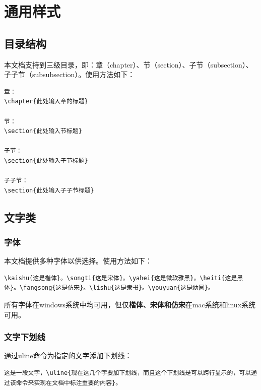 \chapter{通用样式}

\section{目录结构}

本文档支持到三级目录，即：章（chapter）、节（section）、子节（subsection）、子子节（subsubsection）。使用方法如下：

\begin{Verbatim}[]
章：
\chapter{此处输入章的标题}

节：
\section{此处输入节标题}

子节：
\section{此处输入子节标题}

子子节：
\section{此处输入子子节标题}
\end{Verbatim}

\section{文字类}
\subsection{字体}
本文档提供多种字体以供选择。使用方法如下：
\begin{Verbatim}[]
\kaishu{这是楷体}。\songti{这是宋体}。\yahei{这是微软雅黑}。\heiti{这是黑体}。\fangsong{这是仿宋}。\lishu{这是隶书}。\youyuan{这是幼圆}。
\end{Verbatim}

所有字体在windows系统中均可用，但仅\textbf{楷体、宋体和仿宋}在mac系统和linux系统可用。

\subsection{文字下划线}
通过uline命令为指定的文字添加下划线：
\begin{Verbatim}[]
这是一段文字，\uline{现在这几个字要加下划线，而且这个下划线是可以跨行显示的，可以通过该命令来实现在文档中标注重要的内容}。
\end{Verbatim}

